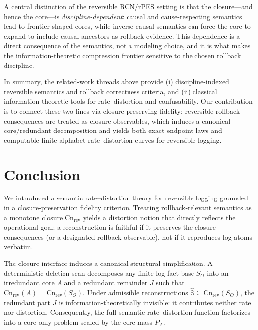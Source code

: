 \documentclass[twoside]{article}
\newcommand{\Cn}{\mathrm{Cn}}
\newcommand{\1}{\mathbf{1}}
\begin{document}
A central distinction of the reversible RCN/rPES setting is that the closure---and hence the core---is
\emph{discipline-dependent}: causal and cause-respecting semantics lead to frontier-shaped cores, while
inverse-causal semantics can force the core to expand to include causal ancestors as rollback evidence.
This dependence is a direct consequence of the semantics, not a modeling choice, and it is what makes the
information-theoretic compression frontier sensitive to the chosen rollback discipline.

In summary, the related-work threads above provide (i) discipline-indexed reversible semantics and rollback correctness criteria, and
(ii) classical information-theoretic tools for rate--distortion and confusability.
Our contribution is to connect these two lines via closure-preserving fidelity: reversible rollback consequences are treated as closure
observables, which induces a canonical core/redundant decomposition and yields both exact endpoint laws and computable finite-alphabet
rate--distortion curves for reversible logging.

\section{Conclusion}
\label{sec:conclusion}

We introduced a semantic rate--distortion theory for reversible logging
grounded in a closure‑preservation fidelity criterion.
Treating rollback‑relevant semantics as a monotone closure \(\Cn_{\mathrm{rev}}\)
yields a distortion notion that directly reflects the operational goal:
a reconstruction is faithful if it preserves the closure consequences
(or a designated rollback observable), not if it reproduces log atoms verbatim.

The closure interface induces a canonical structural simplification.
A deterministic deletion scan decomposes any finite log fact base \(S_O\)
into an irredundant core \(A\) and a redundant remainder \(J\) such that
\(\Cn_{\mathrm{rev}}(A)=\Cn_{\mathrm{rev}}(S_O)\).
Under admissible reconstructions \(\hat{\mathbb{S}}\subseteq \Cn_{\mathrm{rev}}(S_O)\),
the redundant part \(J\) is information‑theoretically invisible:
it contributes neither rate nor distortion.
Consequently, the full semantic rate--distortion function factorizes
into a core‑only problem scaled by the core mass \(P_A\).
\end{document}

